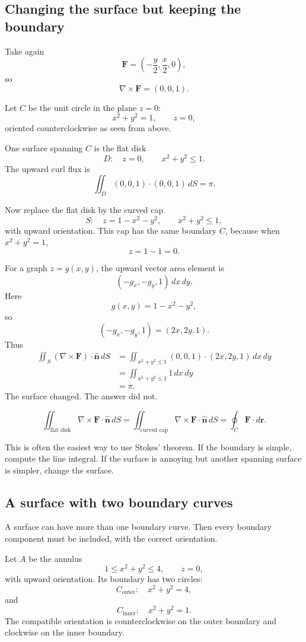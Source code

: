 \subsection{Changing the surface but keeping the boundary}

Take again
\[
    \mathbf F=\left(-\frac y2,\frac x2,0\right),
\]
so
\[
    \nabla\times\mathbf F=(0,0,1).
\]

Let \(C\) be the unit circle in the plane \(z=0\):
\[
    x^2+y^2=1,\qquad z=0,
\]
oriented counterclockwise as seen from above.

One surface spanning \(C\) is the flat disk
\[
    D:\quad z=0,\qquad x^2+y^2\le1.
\]
The upward curl flux is
\[
    \iint_D (0,0,1)\cdot(0,0,1)\,dS=\pi.
\]

Now replace the flat disk by the curved cap
\[
    S:\quad z=1-x^2-y^2,
    \qquad x^2+y^2\le1,
\]
with upward orientation.  This cap has the same boundary \(C\), because when
\(x^2+y^2=1\),
\[
    z=1-1=0.
\]

For a graph \(z=g(x,y)\), the upward vector area element is
\[
    (-g_x,-g_y,1)\,dx\,dy.
\]
Here
\[
    g(x,y)=1-x^2-y^2,
\]
so
\[
    (-g_x,-g_y,1)=(2x,2y,1).
\]
Thus
\[
\begin{aligned}
\iint_S(\nabla\times\mathbf F)\cdot\widehat{\mathbf n}\,dS
&=
\iint_{x^2+y^2\le1}
(0,0,1)\cdot(2x,2y,1)\,dx\,dy\\
&=
\iint_{x^2+y^2\le1}1\,dx\,dy\\
&=
\pi.
\end{aligned}
\]
The surface changed.  The answer did not.

\[
\boxed{
    \iint_{\text{flat disk}}\nabla\times\mathbf F\cdot\widehat{\mathbf n}\,dS
    =
    \iint_{\text{curved cap}}\nabla\times\mathbf F\cdot\widehat{\mathbf n}\,dS
    =
    \oint_C \mathbf F\cdot d\mathbf r.
}
\]

This is often the easiest way to use Stokes' theorem.  If the boundary is simple, compute
the line integral.  If the surface is annoying but another spanning surface is simpler,
change the surface.

\subsection{A surface with two boundary curves}

A surface can have more than one boundary curve.  Then every boundary component
must be included, with the correct orientation.

Let \(A\) be the annulus
\[
    1\le x^2+y^2\le4,
    \qquad z=0,
\]
with upward orientation.  Its boundary has two circles:
\[
    C_{\text{outer}}:\quad x^2+y^2=4,
\]
and
\[
    C_{\text{inner}}:\quad x^2+y^2=1.
\]
The compatible orientation is counterclockwise on the outer boundary and clockwise on
the inner boundary.

